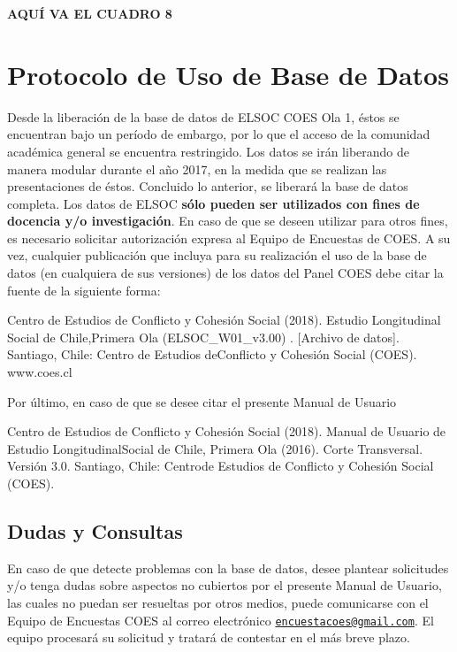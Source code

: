 \documentclass[
]{book}
\begin{document}
\textbf{AQUÍ VA EL CUADRO 8}

\hypertarget{protocolo-de-uso-de-base-de-datos}{%
\chapter{Protocolo de Uso de Base de
Datos}\label{protocolo-de-uso-de-base-de-datos}}

Desde la liberación de la base de datos de ELSOC COES Ola 1, éstos se
encuentran bajo un período de embargo, por lo que el acceso de la
comunidad académica general se encuentra restringido. Los datos se irán
liberando de manera modular durante el año 2017, en la medida que se
realizan las presentaciones de éstos. Concluido lo anterior, se liberará
la base de datos completa. Los datos de ELSOC \textbf{sólo pueden ser
utilizados con fines de docencia y/o investigación}. En caso de que se
deseen utilizar para otros fines, es necesario solicitar autorización
expresa al Equipo de Encuestas de COES. A su vez, cualquier publicación
que incluya para su realización el uso de la base de datos (en
cualquiera de sus versiones) de los datos del Panel COES debe citar la
fuente de la siguiente forma:

Centro de Estudios de Conflicto y Cohesión Social (2018). {Estudio
Longitudinal Social de Chile},Primera Ola (ELSOC\_W01\_v3.00) .
{[}Archivo de datos{]}. Santiago, Chile: Centro de Estudios deConflicto
y Cohesión Social (COES). www.coes.cl

Por último, en caso de que se desee citar el presente Manual de Usuario

Centro de Estudios de Conflicto y Cohesión Social (2018). {Manual de
Usuario de Estudio Longitudinal}{Social de Chile, Primera Ola (2016)}.
Corte Transversal. Versión 3.0. Santiago, Chile: Centrode Estudios de
Conflicto y Cohesión Social (COES).

\hypertarget{dudas-y-consultas}{%
\section{Dudas y Consultas}\label{dudas-y-consultas}}

En caso de que detecte problemas con la base de datos, desee plantear
solicitudes y/o tenga dudas sobre aspectos no cubiertos por el presente
Manual de Usuario, las cuales no puedan ser resueltas por otros medios,
puede comunicarse con el Equipo de Encuestas COES al correo electrónico
\href{mailto:encuestacoes@gmail.com}{\nolinkurl{encuestacoes@gmail.com}}.
El equipo procesará su solicitud y tratará de contestar en el más breve
plazo.
\end{document}
